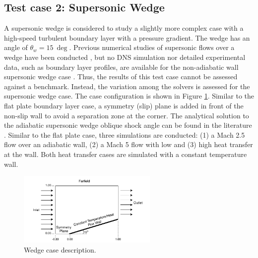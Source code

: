\documentclass[journal ]{new-aiaa}
\begin{document}
\subsection{Test case 2: Supersonic Wedge}\label{sec:supersonicWedge}
A supersonic wedge is considered to study a slightly more complex case with a high-speed turbulent boundary layer with a pressure gradient. The wedge has an angle of $\theta_w = 15~\deg$. Previous numerical studies of supersonic flows over a wedge have been conducted \cite{Wu2007,Wagner2018}, but no DNS simulation nor detailed experimental data, such as boundary layer profiles, are available for the non-adiabatic wall supersonic wedge case \cite{ROY2006469}. Thus, the results of this test case cannot be assessed against a benchmark. Instead, the variation among the solvers is assessed for the supersonic wedge case. The case configuration is shown in Figure \ref{fig:Wedge_Domain}. Similar to the flat plate boundary layer case, a symmetry (slip) plane is added in front of the non-slip wall to avoid a separation zone at the corner. The analytical solution to the adiabatic supersonic wedge oblique shock angle can be found in the literature \cite{anderson2003, Gregory-Smith1983}. Similar to the flat plate case, three simulations are conducted: (1) a Mach 2.5 flow over an adiabatic wall, (2) a Mach 5 flow with low and  (3) high heat transfer at the wall. Both heat transfer cases are simulated with a constant temperature wall.

\begin{figure}
\centering
  \includegraphics[width=0.6\textwidth]{Error/Wedge.pdf}
  \caption{Wedge case description.}
  \label{fig:Wedge_Domain}
\end{figure}
\end{document}
